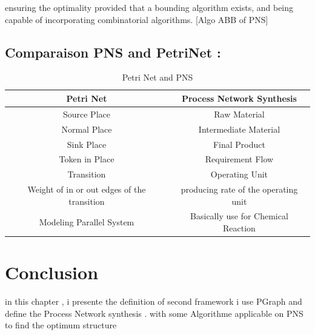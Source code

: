 ensuring the optimality
provided that a bounding algorithm exists, and being capable of incorporating
combinatorial algorithms.  [Algo ABB of PNS]

\subsection{ Comparaison PNS and PetriNet : }
\begin {table}[H] 
\begin{tabular}{cc}

\hline 
\textbf{Petri Net}  & \textbf{Process Network Synthesis}\tabularnewline
\hline 
Source Place  & Raw Material\tabularnewline
Normal Place  & Intermediate Material\tabularnewline
Sink Place  & Final Product\tabularnewline
Token in Place  & Requirement Flow \tabularnewline
Transition  & Operating Unit \tabularnewline
Weight of in or out edges of the  transition & producing rate of the operating unit\tabularnewline
\hline 
Modeling Parallel System  & Basically use for Chemical Reaction \tabularnewline
\hline 

\end{tabular}
\caption {Petri Net and PNS}
 
\end {table}

\section{Conclusion}
in this chapter , i presente the definition of second framework i use
PGraph and define the Process Network synthesis .
with some Algorithme applicable on PNS
to find the optimum structure